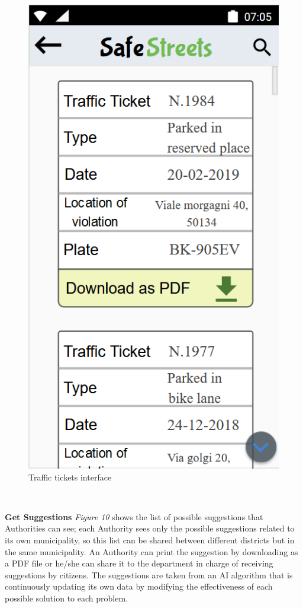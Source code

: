     \vspace{5mm}
    \begin{figure}[h]
        \centering
        \includegraphics[scale=0.8]{Images/traffic_ticket.png}
        \caption{Traffic tickets interface}
    \end{figure}\
    \newpage
 
    \newpage\vspace{3mm}
    \noindent\textbf{Get Suggestions}\newline
    \textit{Figure 10} shows the list of possible suggestions that Authorities can see; each Authority sees only the possible suggestions related to its own municipality, so this list can be shared between different districts but in the same municipality. An Authority can print the suggestion by downloading as a PDF file or he/she can share it to the department in charge of receiving suggestions by citizens. The suggestions are taken from an AI algorithm  that is continuously updating its own data by modifying the effectiveness of each possible solution to each problem.  
    
